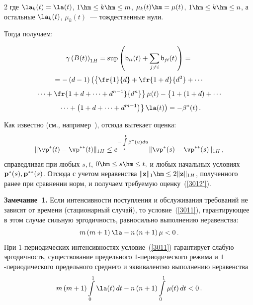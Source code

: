 \begin{multicols}{2}
\noindent
где $\la_k(t)=\la(t)$, $1 \hm\le k \hm\le m$,  $\mu_k(t)\hm=\mu(t)$, $1 \hm\le k \hm\le n$, 
а остальные $\la_k(t)$, $\mu_k(t)$~--- тождественные нули.

\columnbreak

Тогда получаем:

\noindent
\begin{multline*}
\gamma \left(B(t)\right)_{1H} = \sup \left(\textsf{b}_{ii}(t)  + 
\sum\limits_{j \neq i}\textsf{b}_{ji}(t)\right) = {}  \\[3pt]
{}= -\left( d-1\right)\left(\left\{\fr{1}{d} + \fr{1+d}{d^2} + \cdots{}\right.\right.\\[4pt]
\left.{}\cdots +
\fr{1+d+\cdots+d^{n-1}}{d^n}\right\}\mu(t) - 
 \left\{ \vphantom{d^{m-1}}
 1 + \left(1+d\right)+\cdots{}\right.\\[4pt]
\left.\left. {}\cdots+\left(1+d+\cdots+d^{m-1}\right)\right\}\la(t) 
\vphantom{\fr{1}{d}}\right) = -\beta^*(t)\,.  %
\end{multline*}

Как известно (см., например~\cite{z12}), отсюда вытекает оценка:
\begin{equation*}
\|\vp^*(t)-\vp^{**}(t)\|_{1H} \le e^{-\int\limits_s^t {\beta^*(u)du}}\|\vp^*(s)-\vp^{**}(s)\|_{1H}\,,
 \end{equation*}
справедливая при любых $s,t$, $0\hm\le s\hm\le t,$ и любых начальных условиях 
${\bf p^*}(s), {\bf p^{**}}(s)$. Отсюда с учетом неравенства 
$\|{\bf z}\|_{1} \hm\le 2\|{\bf z}\|_{1H}$, полученного ранее при сравнении норм, и 
получаем требуемую оценку~(\ref{3012'}).

\medskip


\noindent
\textbf{Замечание~1.}
Если интенсивности поступления и обслуживания требований не зависят от времени 
(стационарный случай), то условие~(\ref{3011}), гарантирующее в этом случае 
сильную эргодичность, равносильно выполнению неравенства:
\begin{equation*}
 m\left(m+1\right)\la - n\left(n+1\right)\mu < 0\,.
\end{equation*}
При $1$-периодических интенсивностях условие~(\ref{3011}) гарантирует 
слабую эргодичность,  существование предельного $1$-пе\-рио\-ди\-че\-ско\-го 
режима и $1$-пе\-рио\-ди\-че\-ско\-го предельного среднего и эквивалентно 
выполнению неравенства
\begin{equation*}
 m\left(m+1\right)\int\limits_0^1\la(t) \, dt  - n\left(n+1\right)\int\limits_0^1\mu(t) \, dt < 0\,.
\end{equation*}


\end{multicols}
